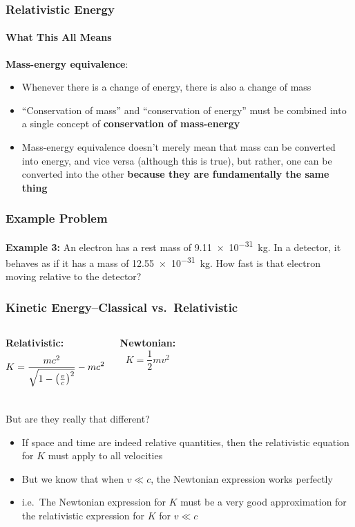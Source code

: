 \documentclass[12pt,compress,aspectratio=169]{beamer}
\newcommand{\bigsqrt}{\ensuremath\sqrt{1-\left(\frac{v}{c}\right)^2}}
\newcommand{\eq}[2]{\vspace{#1}{\Large\begin{displaymath}#2\end{displaymath}}}
\begin{document}
\begin{frame}
  \frametitle{Relativistic Energy}
  \framesubtitle{What This All Means}
  
  \eq{-.2in}{
    \boxed{E=mc^2}
  }

  \textbf{Mass-energy equivalence}:
  \begin{itemize}
  \item Whenever there is a change of energy, there is also a change of mass
  \item ``Conservation of mass'' and ``conservation of energy'' must be
    combined into a single concept of \textbf{conservation of mass-energy}
  \item Mass-energy equivalence doesn't merely mean that mass can be converted
    into energy, and vice versa (although this is true), but rather, one can be
    converted into the other
    \textbf{because they are fundamentally the same thing}
  \end{itemize}
\end{frame}



\begin{frame}
  \frametitle{Example Problem}
  \textbf{Example 3:} An electron has a rest mass of \SI{9.11e-31}{\kilo\gram}.
  In a detector, it behaves as if it has a mass of \SI{12.55e-31}{\kilo\gram}.
  How fast is that electron moving relative to the detector?
\end{frame}


\begin{frame}
  \frametitle{Kinetic Energy--Classical vs.\ Relativistic}
  \begin{columns}
    \textbf{Relativistic:}
    {\Large
      \begin{displaymath}
        K=\frac{mc^2}{\bigsqrt}-mc^2
      \end{displaymath}
    }
    
    \textbf{Newtonian:}
    {\Large
      \begin{displaymath}
        K=\frac{1}{2}mv^2
      \end{displaymath}
    }
  \end{columns}
  But are they really that different?
  \begin{itemize}
  \item If space and time are indeed relative quantities, then the relativistic
    equation for $K$ must apply to all velocities
  \item But we know that when $v\ll c$, the Newtonian expression works perfectly
  \item i.e.\ The Newtonian expression for $K$ must be a very good approximation
    for the relativistic expression for $K$ for $v\ll c$
  \end{itemize}
\end{frame}
\end{document}
